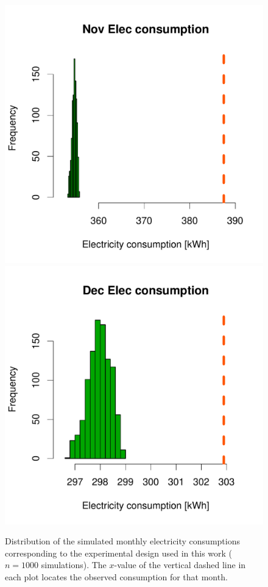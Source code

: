 \documentclass[a4paper, 12pt]{article}
\begin{document}
\begin{figure}
 \includegraphics[width=\scale]{Simulation_histograms/Batch_2_Only/Elec_Runs/Nov_Elec}
 \includegraphics[width=\scale]{Simulation_histograms/Batch_2_Only/Elec_Runs/Dec_Elec}\\
 \caption{Distribution of the simulated monthly electricity
 consumptions corresponding to the experimental design used in this work ($n=1000$ simulations).
 The $x$-value of the vertical dashed line in each plot locates the observed consumption for that month.}
 \label{Fig_Output_Hist_Elec}
\end{figure}
\end{document}
